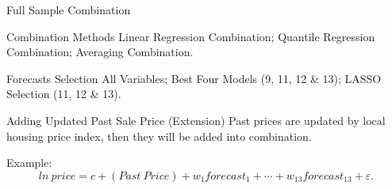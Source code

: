 \documentclass{beamer}
\begin{document}
\begin{frame}[t]{Full Sample Combination}
\begin{block}{Combination Methods}
\vspace{0.5em}
Linear Regression Combination; Quantile Regression Combination; Averaging Combination.
\end{block}

\begin{block}{Forecasts Selection}
\vspace{0.5em}
All Variables; Best Four Models (9, 11, 12 \& 13); LASSO Selection (11, 12 \& 13).
\end{block}

\begin{block}{Adding Updated Past Sale Price (Extension)}
\vspace{0.5em}
Past prices are updated by local housing price index, then they will be added into combination. 
\end{block}

\begin{block}{Example:}
\vspace*{-\baselineskip}
\begin{equation}
ln~price = c + (Past~Price) + w_1 forecast_1 + \cdots + w_{13} forecast_{13} + \varepsilon.
\end{equation}
\end{block}

\end{frame}
\end{document}

